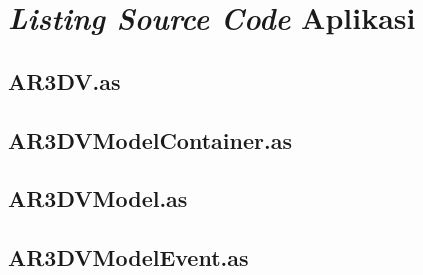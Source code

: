 \appendix

\chapter{\textit{Listing Source Code} Aplikasi}
\label{lampiran:listing_aplikasi}

\lstset{language=ActionScript,numbers=left}

\section{AR3DV.as}
\label{lampiran:AR3DV}


\pagebreak

\section{AR3DVModelContainer.as}
\label{subsec:lampiran:AR3DVModelContainer}


\pagebreak
	
\section{AR3DVModel.as}
\label{lampiran:AR3DVModel}


\pagebreak

\section{AR3DVModelEvent.as}
\label{lampiran:AR3DVModelEvent}


\pagebreak	
	

%
